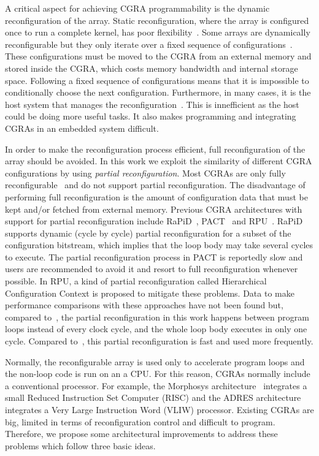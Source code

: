 \documentclass[journal]{IEEEtran}
\begin{document}
A critical aspect for achieving CGRA programmability is the dynamic
reconfiguration of the array. Static reconfiguration, where the array
is configured once to run a complete kernel, has poor
flexibility~\cite{Hartenstein01}. Some arrays are dynamically
reconfigurable but they only iterate over a fixed sequence of
configurations~\cite{Quax04,Mei05,Lee00}. These configurations must be
moved to the CGRA from an external memory and stored inside the CGRA,
which costs memory bandwidth and internal storage space. Following a
fixed sequence of configurations means that it is impossible to
conditionally choose the next configuration. Furthermore, in many
cases, it is the host system that manages the
reconfiguration~\cite{Lee00,Mei05,Hartenstein99}. This is innefficient
as the host could be doing more useful tasks. It also makes
programming and integrating CGRAs in an embedded system difficult.

In order to make the reconfiguration process efficient, full
reconfiguration of the array should be avoided. In this work we
exploit the similarity of different CGRA configurations by using {\em
  partial reconfiguration}. Most CGRAs are only fully
reconfigurable~\cite{Mei05,Lee00,Hartenstein99} and do not support
partial reconfiguration. The disadvantage of performing full
reconfiguration is the amount of configuration data that must be kept
and/or fetched from external memory. Previous CGRA architectures with
support for partial reconfiguration include RaPiD~\cite{Ebeling96},
PACT~\cite{Weinhardt03} and RPU~\cite{Liu15}. RaPiD supports dynamic
(cycle by cycle) partial reconfiguration for a subset of the
configuration bitstream, which implies that the loop body may take
several cycles to execute. The partial reconfiguration process in PACT
is reportedly slow and users are recommended to avoid it and resort to
full reconfiguration whenever possible. In RPU, a kind of partial
reconfiguration called Hierarchical Configuration Context is proposed
to mitigate these problems.  Data to make performance comparisons with
these approaches have not been found but, compared
to~\cite{Ebeling96}, the partial reconfiguration in this work happens
between program loops instead of every clock cycle, and the whole loop
body executes in only one cycle. Compared to~\cite{Weinhardt03}, this
partial reconfiguration is fast and used more frequently.

Normally, the reconfigurable array is used only to accelerate program
loops and the non-loop code is run on an a CPU. For this reason, CGRAs
normally include a conventional processor. For example, the Morphosys
architecture~\cite{Lee00} integrates a small Reduced Instruction Set
Computer (RISC) and the ADRES architecture~\cite{Mei05} integrates a
Very Large Instruction Word (VLIW) processor. Existing CGRAs are big,
limited in terms of reconfiguration control and difficult to
program. Therefore, we propose some architectural improvements to
address these problems which follow three basic ideas.
\end{document}
